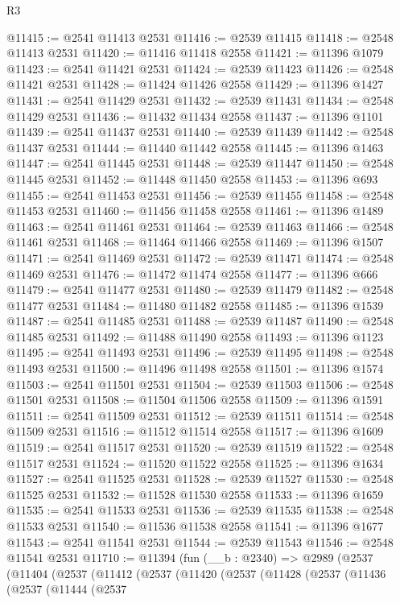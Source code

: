 \begin{lexlean}{R3}
\begin{coremodule}
@11415 := @2541 @11413 @2531
@11416 := @2539 @11415
@11418 := @2548 @11413 @2531
@11420 := @11416 @11418 @2558
@11421 := @11396 @1079
@11423 := @2541 @11421 @2531
@11424 := @2539 @11423
@11426 := @2548 @11421 @2531
@11428 := @11424 @11426 @2558
@11429 := @11396 @1427
@11431 := @2541 @11429 @2531
@11432 := @2539 @11431
@11434 := @2548 @11429 @2531
@11436 := @11432 @11434 @2558
@11437 := @11396 @1101
@11439 := @2541 @11437 @2531
@11440 := @2539 @11439
@11442 := @2548 @11437 @2531
@11444 := @11440 @11442 @2558
@11445 := @11396 @1463
@11447 := @2541 @11445 @2531
@11448 := @2539 @11447
@11450 := @2548 @11445 @2531
@11452 := @11448 @11450 @2558
@11453 := @11396 @693
@11455 := @2541 @11453 @2531
@11456 := @2539 @11455
@11458 := @2548 @11453 @2531
@11460 := @11456 @11458 @2558
@11461 := @11396 @1489
@11463 := @2541 @11461 @2531
@11464 := @2539 @11463
@11466 := @2548 @11461 @2531
@11468 := @11464 @11466 @2558
@11469 := @11396 @1507
@11471 := @2541 @11469 @2531
@11472 := @2539 @11471
@11474 := @2548 @11469 @2531
@11476 := @11472 @11474 @2558
@11477 := @11396 @666
@11479 := @2541 @11477 @2531
@11480 := @2539 @11479
@11482 := @2548 @11477 @2531
@11484 := @11480 @11482 @2558
@11485 := @11396 @1539
@11487 := @2541 @11485 @2531
@11488 := @2539 @11487
@11490 := @2548 @11485 @2531
@11492 := @11488 @11490 @2558
@11493 := @11396 @1123
@11495 := @2541 @11493 @2531
@11496 := @2539 @11495
@11498 := @2548 @11493 @2531
@11500 := @11496 @11498 @2558
@11501 := @11396 @1574
@11503 := @2541 @11501 @2531
@11504 := @2539 @11503
@11506 := @2548 @11501 @2531
@11508 := @11504 @11506 @2558
@11509 := @11396 @1591
@11511 := @2541 @11509 @2531
@11512 := @2539 @11511
@11514 := @2548 @11509 @2531
@11516 := @11512 @11514 @2558
@11517 := @11396 @1609
@11519 := @2541 @11517 @2531
@11520 := @2539 @11519
@11522 := @2548 @11517 @2531
@11524 := @11520 @11522 @2558
@11525 := @11396 @1634
@11527 := @2541 @11525 @2531
@11528 := @2539 @11527
@11530 := @2548 @11525 @2531
@11532 := @11528 @11530 @2558
@11533 := @11396 @1659
@11535 := @2541 @11533 @2531
@11536 := @2539 @11535
@11538 := @2548 @11533 @2531
@11540 := @11536 @11538 @2558
@11541 := @11396 @1677
@11543 := @2541 @11541 @2531
@11544 := @2539 @11543
@11546 := @2548 @11541 @2531
@11710 := @11394
    (fun (__b : @2340) =>
    @2989
      (@2537
        (@11404
          (@2537
            (@11412
              (@2537
                (@11420
                  (@2537
                    (@11428
                      (@2537
                        (@11436
                          (@2537
                            (@11444
                              (@2537

\end{coremodule}
\end{lexlean}
